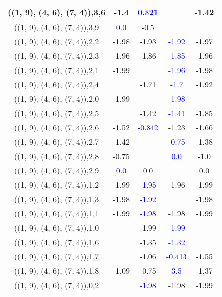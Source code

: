\documentclass{article}
\begin{document}
\begin{center}
\begin{longtable}{|c|c|c|c|c|}
        	\hline
        	((1, 9), (4, 6), (7, 4)),3,6&-1.4& \textcolor{blue}{0.321}&&-1.42\\
        	\hline
        	((1, 9), (4, 6), (7, 4)),3,9& \textcolor{blue}{0.0}&-0.5&&\\
        	\hline
        	((1, 9), (4, 6), (7, 4)),2,2&-1.98&-1.93& \textcolor{blue}{-1.92}&-1.97\\
        	\hline
        	((1, 9), (4, 6), (7, 4)),2,3&-1.96&-1.86& \textcolor{blue}{-1.85}&-1.96\\
        	\hline
        	((1, 9), (4, 6), (7, 4)),2,1&-1.99&& \textcolor{blue}{-1.96}&-1.98\\
        	\hline
        	((1, 9), (4, 6), (7, 4)),2,4&&-1.71& \textcolor{blue}{-1.7}&-1.92\\
        	\hline
        	((1, 9), (4, 6), (7, 4)),2,0&-1.99&& \textcolor{blue}{-1.98}&\\
        	\hline
        	((1, 9), (4, 6), (7, 4)),2,5&&-1.42& \textcolor{blue}{-1.41}&-1.85\\
        	\hline
        	((1, 9), (4, 6), (7, 4)),2,6&-1.52& \textcolor{blue}{-0.842}&-1.23&-1.66\\
        	\hline
        	((1, 9), (4, 6), (7, 4)),2,7&-1.42&& \textcolor{blue}{-0.75}&-1.38\\
        	\hline
        	((1, 9), (4, 6), (7, 4)),2,8&-0.75&& \textcolor{blue}{0.0}&-1.0\\
        	\hline
        	((1, 9), (4, 6), (7, 4)),2,9& \textcolor{blue}{0.0}&0.0&&0.0\\
        	\hline
        	((1, 9), (4, 6), (7, 4)),1,2&-1.99& \textcolor{blue}{-1.95}&-1.96&-1.99\\
        	\hline
        	((1, 9), (4, 6), (7, 4)),1,3&-1.98& \textcolor{blue}{-1.92}&&-1.98\\
        	\hline
        	((1, 9), (4, 6), (7, 4)),1,1&-1.99& \textcolor{blue}{-1.98}&-1.98&-1.99\\
        	\hline
        	((1, 9), (4, 6), (7, 4)),1,0&&-1.99& \textcolor{blue}{-1.99}&\\
        	\hline
        	((1, 9), (4, 6), (7, 4)),1,6&&-1.35& \textcolor{blue}{-1.32}&\\
        	\hline
        	((1, 9), (4, 6), (7, 4)),1,7&&-1.06& \textcolor{blue}{-0.413}&-1.55\\
        	\hline
        	((1, 9), (4, 6), (7, 4)),1,8&-1.09&-0.75& \textcolor{blue}{3.5}&-1.37\\
        	\hline
        	((1, 9), (4, 6), (7, 4)),0,2&& \textcolor{blue}{-1.98}&-1.98&-1.99\\

\end{longtable}
\end{center}
\end{document}
